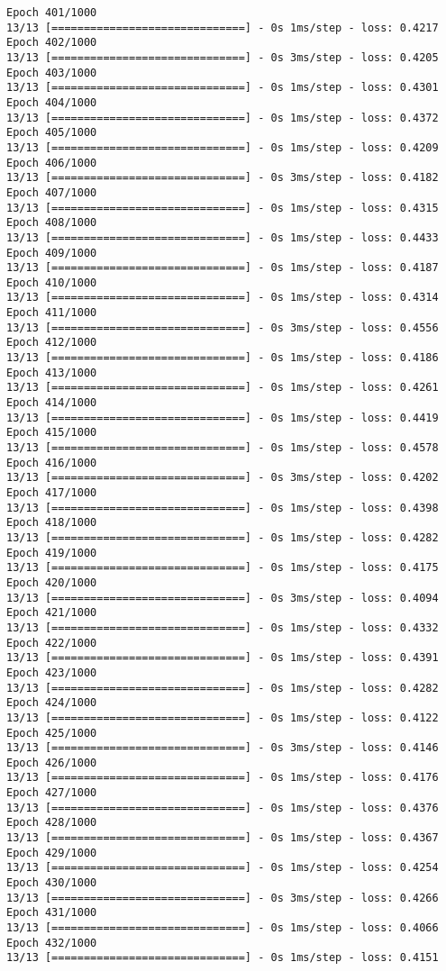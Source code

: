 \documentclass[11pt]{article}
\begin{document}
\begin{Verbatim}[commandchars=\\\{\}]
Epoch 401/1000
13/13 [==============================] - 0s 1ms/step - loss: 0.4217
Epoch 402/1000
13/13 [==============================] - 0s 3ms/step - loss: 0.4205
Epoch 403/1000
13/13 [==============================] - 0s 1ms/step - loss: 0.4301
Epoch 404/1000
13/13 [==============================] - 0s 1ms/step - loss: 0.4372
Epoch 405/1000
13/13 [==============================] - 0s 1ms/step - loss: 0.4209
Epoch 406/1000
13/13 [==============================] - 0s 3ms/step - loss: 0.4182
Epoch 407/1000
13/13 [==============================] - 0s 1ms/step - loss: 0.4315
Epoch 408/1000
13/13 [==============================] - 0s 1ms/step - loss: 0.4433
Epoch 409/1000
13/13 [==============================] - 0s 1ms/step - loss: 0.4187
Epoch 410/1000
13/13 [==============================] - 0s 1ms/step - loss: 0.4314
Epoch 411/1000
13/13 [==============================] - 0s 3ms/step - loss: 0.4556
Epoch 412/1000
13/13 [==============================] - 0s 1ms/step - loss: 0.4186
Epoch 413/1000
13/13 [==============================] - 0s 1ms/step - loss: 0.4261
Epoch 414/1000
13/13 [==============================] - 0s 1ms/step - loss: 0.4419
Epoch 415/1000
13/13 [==============================] - 0s 1ms/step - loss: 0.4578
Epoch 416/1000
13/13 [==============================] - 0s 3ms/step - loss: 0.4202
Epoch 417/1000
13/13 [==============================] - 0s 1ms/step - loss: 0.4398
Epoch 418/1000
13/13 [==============================] - 0s 1ms/step - loss: 0.4282
Epoch 419/1000
13/13 [==============================] - 0s 1ms/step - loss: 0.4175
Epoch 420/1000
13/13 [==============================] - 0s 3ms/step - loss: 0.4094
Epoch 421/1000
13/13 [==============================] - 0s 1ms/step - loss: 0.4332
Epoch 422/1000
13/13 [==============================] - 0s 1ms/step - loss: 0.4391
Epoch 423/1000
13/13 [==============================] - 0s 1ms/step - loss: 0.4282
Epoch 424/1000
13/13 [==============================] - 0s 1ms/step - loss: 0.4122
Epoch 425/1000
13/13 [==============================] - 0s 3ms/step - loss: 0.4146
Epoch 426/1000
13/13 [==============================] - 0s 1ms/step - loss: 0.4176
Epoch 427/1000
13/13 [==============================] - 0s 1ms/step - loss: 0.4376
Epoch 428/1000
13/13 [==============================] - 0s 1ms/step - loss: 0.4367
Epoch 429/1000
13/13 [==============================] - 0s 1ms/step - loss: 0.4254
Epoch 430/1000
13/13 [==============================] - 0s 3ms/step - loss: 0.4266
Epoch 431/1000
13/13 [==============================] - 0s 1ms/step - loss: 0.4066
Epoch 432/1000
13/13 [==============================] - 0s 1ms/step - loss: 0.4151

\end{Verbatim}
\end{document}
